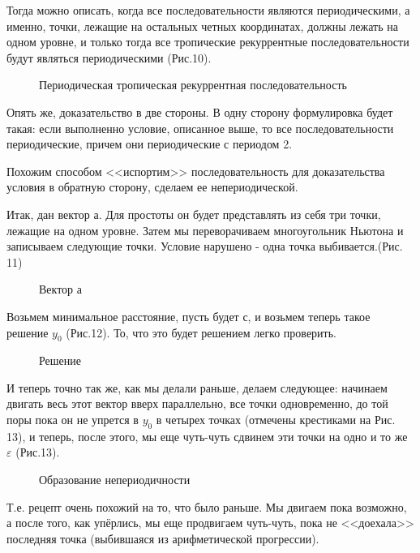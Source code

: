 \documentclass[russian]{lecture-notes}
\begin{document}
Тогда можно описать, когда все последовательности являются периодическими, а именно, точки, лежащие на остальных четных координатах, должны лежать на одном уровне, и только тогда все тропические рекуррентные последовательности будут являться периодическими (Рис.10).

\begin{figure}[h!]
\caption{Периодическая тропическая рекуррентная последовательность}
\end{figure}


Опять же, доказательство в две стороны. В одну сторону формулировка будет такая: если выполненно условие, описанное выше, то все последовательности периодические, причем они
периодические с периодом 2.

Похожим способом <<испортим>> последовательность для доказательства условия в обратную сторону, сделаем ее непериодической.


Итак, дан вектор а. Для простоты он будет представлять из себя три точки, лежащие на одном уровне. Затем мы переворачиваем многоугольник Ньютона и записываем следующие точки. Условие нарушено - одна точка выбивается.(Рис. 11)

\begin{figure}[h!]
\caption{Вектор а}
\end{figure}

Возьмем минимальное расстояние, пусть будет с, и возьмем теперь такое решение $y_0$ (Рис.12). То, что это будет решением легко проверить.

\begin{figure}[h!]
\caption{Решение}
\end{figure}
И теперь точно так же, как мы делали раньше, делаем следующее: начинаем двигать весь этот вектор вверх
параллельно, все точки одновременно, до той поры пока он не упрется в $y_0$ в четырех точках (отмечены крестиками на Рис. 13), и теперь, после
этого, мы еще чуть-чуть сдвинем эти точки на одно и то же $\varepsilon$ (Рис.13).

\begin{figure}[h!]
\caption{Образование непериодичности}
\label{fig:image}
\end{figure}
Т.е. рецепт
очень похожий на то, что было раньше. Мы двигаем пока возможно, а после того, как упёрлись, мы еще продвигаем чуть-чуть, пока не <<доехала>> последняя точка (выбившаяся из арифметической прогрессии).
\end{document}
